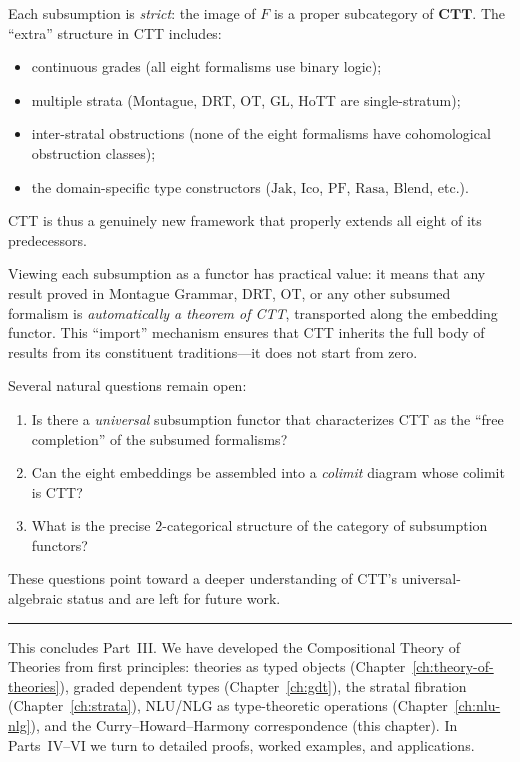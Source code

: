 \begin{remark}
Each subsumption is \emph{strict}: the image of $F$ is a proper
subcategory of $\mathbf{CTT}$.  The ``extra'' structure in CTT
includes:
\begin{itemize}[nosep]
\item continuous grades (all eight formalisms use binary logic);
\item multiple strata (Montague, DRT, OT, GL, HoTT are
  single-stratum);
\item inter-stratal obstructions (none of the eight formalisms have
  cohomological obstruction classes);
\item the domain-specific type constructors ($\mathrm{Jak}$,
  $\mathrm{Ico}$, $\mathrm{PF}$, $\mathrm{Rasa}$, $\mathrm{Blend}$,
  etc.).
\end{itemize}
CTT is thus a genuinely new framework that properly extends all
eight of its predecessors.
\end{remark}

\begin{remark}
Viewing each subsumption as a functor has practical value: it means
that any result proved in Montague Grammar, DRT, OT, or any other
subsumed formalism is \emph{automatically a theorem of CTT},
transported along the embedding functor.  This ``import'' mechanism
ensures that CTT inherits the full body of results from its
constituent traditions---it does not start from zero.
\end{remark}

\begin{remark}
Several natural questions remain open:
\begin{enumerate}[label=(\roman*)]
\item Is there a \emph{universal} subsumption functor that
  characterizes CTT as the ``free completion'' of the subsumed
  formalisms?
\item Can the eight embeddings be assembled into a \emph{colimit}
  diagram whose colimit is CTT?
\item What is the precise $2$-categorical structure of the category
  of subsumption functors?
\end{enumerate}
These questions point toward a deeper understanding of CTT's
universal-algebraic status and are left for future work.
\end{remark}

\bigskip
\noindent\rule{\textwidth}{0.4pt}

\medskip
This concludes Part~III.  We have developed the Compositional Theory
of Theories from first principles: theories as typed objects
(Chapter~\ref{ch:theory-of-theories}), graded dependent types
(Chapter~\ref{ch:gdt}), the stratal fibration
(Chapter~\ref{ch:strata}), NLU/NLG as type-theoretic operations
(Chapter~\ref{ch:nlu-nlg}), and the Curry--Howard--Harmony
correspondence (this chapter).  In Parts~IV--VI we turn to detailed
proofs, worked examples, and applications.
